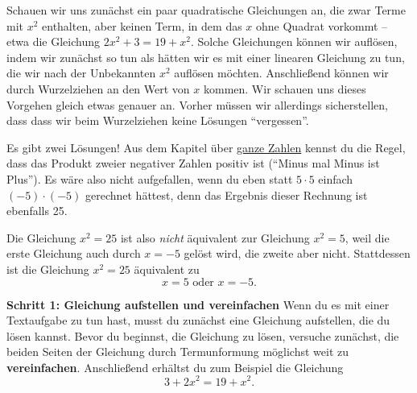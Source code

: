 \documentclass[../../main.tex]{subfiles}
\begin{document}
Schauen wir uns zunächst ein paar quadratische Gleichungen an, die zwar Terme mit $x^2$ 
enthalten, aber keinen Term, in dem das $x$ ohne Quadrat vorkommt -- etwa die Gleichung $2x^2+3=19+x^2$.
Solche Gleichungen können wir auflösen, indem wir zunächst so tun als hätten wir es mit einer linearen
Gleichung zu tun, die wir nach der Unbekannten $x^2$ auflösen möchten. Anschließend können wir durch Wurzelziehen an den
Wert von $x$ kommen. Wir schauen uns dieses Vorgehen gleich etwas genauer an. Vorher müssen wir allerdings sicherstellen,
dass dass wir beim Wurzelziehen keine Lösungen \enquote{vergessen}.

\begin{example}{Es gibt zwei Lösungen!}
    Aus dem Kapitel über \hyperlink{ch:ganze-zahlen}{ganze Zahlen} kennst du die Regel, dass das Produkt zweier
    negativer Zahlen positiv ist (\enquote{Minus mal Minus ist Plus}). Es wäre also nicht aufgefallen, wenn du eben 
    statt $5\cdot 5$ einfach $(-5)\cdot (-5)$ gerechnet hättest, denn das Ergebnis dieser Rechnung ist ebenfalls 25.

    Die Gleichung $x^2=25$ ist also \emph{nicht} äquivalent zur Gleichung $x^2=5$, weil die erste Gleichung auch durch
    $x=-5$ gelöst wird, die zweite aber nicht. Stattdessen ist die Gleichung $x^2=25$ äquivalent zu
    \[x=5\text{ oder }x=-5.\]
\end{example}

\textbf{Schritt 1: Gleichung aufstellen und vereinfachen}
Wenn du es mit einer Textaufgabe zu tun hast, musst du zunächst eine Gleichung aufstellen, die du lösen kannst. Bevor du
beginnst, die Gleichung zu lösen, versuche zunächst, die beiden Seiten der Gleichung durch Termunformung möglichst weit
zu \textbf{vereinfachen}. Anschließend erhältst du zum Beispiel die Gleichung
\[3+2x^2=19+x^2.\]
\end{document}
